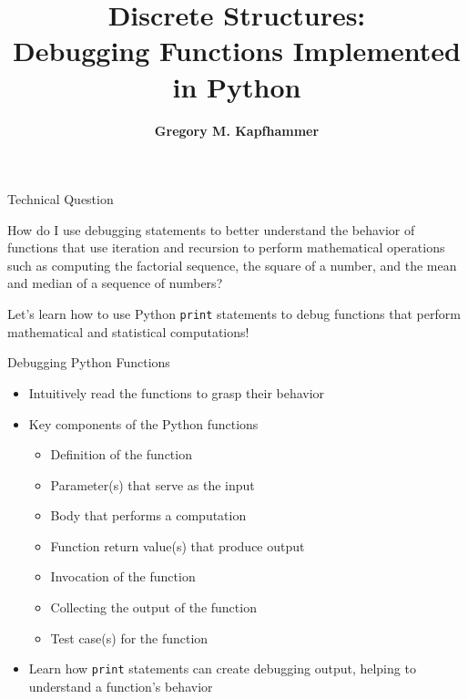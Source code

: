 \documentclass[14pt,aspectratio=169]{beamer}
\title{Discrete Structures: \\ Debugging Functions Implemented in Python}
\author{{\bf Gregory M. Kapfhammer}}
\institute[shortinst]{{\bf Department of Computer Science, Allegheny College}}
\begin{document}
{
  \begin{frame}
    \titlepage
  \end{frame}
}

%
\begin{frame}{Technical Question}
  \begin{center}
    {\large How do I use debugging statements to better understand the behavior
      of functions that use iteration and recursion to perform mathematical
      operations such as computing the factorial sequence, the square of a number,
    and the mean and median of a sequence of numbers?}
  \end{center}
  \vspace{1ex}
  \begin{center}
    \small Let's learn how to use Python {\tt print} statements to debug
    functions that perform mathematical and statistical computations!
  \end{center}
\end{frame}

%
\begin{frame}{Debugging Python Functions}
  \begin{itemize}
    \item Intuitively read the functions to grasp their behavior
      \vspace*{-.15in}
    \item Key components of the Python functions
      \begin{itemize}
        \item Definition of the function
        \item Parameter(s) that serve as the input
        \item Body that performs a computation
        \item Function return value(s) that produce output
        \item Invocation of the function
        \item Collecting the output of the function
        \item Test case(s) for the function
      \end{itemize}
      \vspace*{-.2in}
    \item Learn how {\tt print} statements can create debugging output,
      helping to understand a function's behavior
  \end{itemize}
\end{frame}
\end{document}
